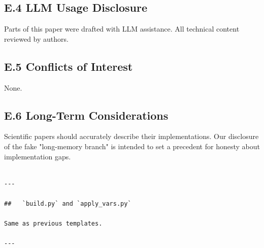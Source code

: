 \subsection{E.4 LLM Usage Disclosure}

Parts of this paper were drafted with LLM assistance. All technical content 
reviewed by authors.

\subsection{E.5 Conflicts of Interest}

None.

\subsection{E.6 Long-Term Considerations}

Scientific papers should accurately describe their implementations. Our 
disclosure of the fake "long-memory branch" is intended to set a precedent 
for honesty about implementation gaps.
\begin{lstlisting}

---

##   `build.py` and `apply_vars.py`

Same as previous templates.

---
\end{lstlisting}